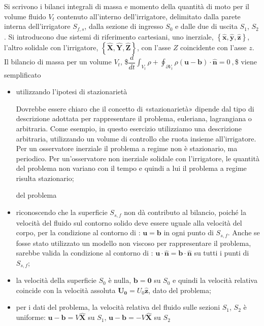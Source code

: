 \documentclass[letterpaper,10pt,italian]{jupyterBook}
\begin{document}
\sphinxAtStartPar
Si scrivono i bilanci integrali di massa e momento della quantità di
moto per il volume fluido \(V_t\) contenuto all’interno dell’irrigatore,
delimitato dalla parete interna dell’irrigatore \(S_{f,s}\), dalla sezione
di ingresso \(S_0\) e dalle due di uscita \(S_1\), \(S_2\). Si introducono due
sistemi di riferimento cartesiani, uno inerziale,
\(\left\{ \bm{\hat{x}}, \bm{\hat{y}}, \bm{\hat{z}} \right\}\), l’altro
solidale con l’irrigatore,
\(\left\{ \bm{\hat{X}}, \bm{\hat{Y}}, \bm{\hat{Z}} \right\}\), con l’asse
\(Z\) coincidente con l’asse \(z\). Il bilancio di massa per un volume
\(V_t\),
\$\(\dfrac{d}{dt} \int_{V_t} \rho + \oint_{\partial V_t} \rho \left(\bm{u} - \bm{b} \right) \cdot \bm{\hat{n}} = 0 \ ,\)\$
viene semplificato
\begin{itemize}
\item {} 
\sphinxAtStartPar
utilizzando l’ipotesi di stazionarietà%
\begin{footnote}[1]\sphinxAtStartFootnote
Dovrebbe essere chiaro che il concetto di «stazionarietà» dipende
dal tipo di descrizione adottata per rappresentare il problema,
euleriana, lagrangiana o arbitraria. Come esempio, in questo
esercizio utilizziamo una descrizione arbitraria, utilizzando un
volume di controllo che ruota insieme all’irrigatore. Per un
osservatore inerziale il problema a regime non è stazionario, ma
periodico. Per un’osservatore non inerziale solidale con
l’irrigatore, le quantità del problema non variano con il tempo e
quindi a lui il problema a regime risulta stazionario;
%
\end{footnote} del problema

\item {} 
\sphinxAtStartPar
riconoscendo che la superficie \(S_{s,f}\) non dà contributo al
bilancio, poiché la velocità del fluido sul contorno solido deve
essere uguale alla velocità del corpo, per la condizione al contorno
di : \(\bm{u} = \bm{b}\) in ogni punto di \(S_{s,f}\). Anche
se fosse stato utilizzato un modello non viscoso per rappresentare
il problema, sarebbe valida la condizione al contorno di :
\(\bm{u} \cdot \bm{\hat{n}} = \bm{b} \cdot \bm{\hat{n}}\) su tutti i
punti di \(S_{s,f}\);

\item {} 
\sphinxAtStartPar
la velocità della superficie \(S_0\) è nulla, \(\bm{b} = \bm{0}\) su
\(S_0\) e quindi la velocità relativa coincide con la velocità
assoluta \(\bm{U_0} = U_0 \bm{\hat{z}}\), dato del problema;

\item {} 
\sphinxAtStartPar
per i dati del problema, la velocità relativa del fluido sulle
sezioni \(S_1\), \(S_2\) è uniforme: \(\bm{u}-\bm{b} = V \bm{\hat{X}}\) su
\(S_1\), \(\bm{u}-\bm{b} = -V \bm{\hat{X}}\) su \(S_2\)

\end{itemize}
\end{document}
